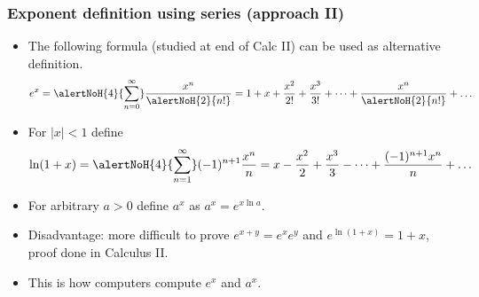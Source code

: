 \begin{frame}
\frametitle{Exponent definition using series (approach II)}
\begin{itemize}
\item<1-> The following formula (studied at end of Calc II) can be used as alternative definition.
\[
e^{x}=\alertNoH{4}{\sum_{n=0}^{\infty}} \frac{x^n}{\alertNoH{2}{n!}}= 1+ x+\frac{x^2}{2!}+\frac{x^3}{3!}+\dots + \frac{x^{n}}{\alertNoH{2}{n!}}+\dots
\]
\item<3-> For $|x|<1$ define 
\[
\ln (1+x)=\alertNoH{4}{\sum_{n=1}^{\infty}} (-1)^{n+1}\frac{x^n}{n}=  x-\frac{x^2}{2}+\frac{x^3}{3}-\dots + \frac{(-1)^{n+1}x^{n}}{n}+\dots
\]
\item<5-> For arbitrary $a>0$ define $a^x$ as $a^x=e^{x\ln a}$. 
\item<6-> Disadvantage: more difficult to prove $e^{x+y}= e^{x} e^y$ and $e^{\ln(1+x)}=1+x$, proof done in Calculus II.
\item<7-> This is how computers compute $e^x$ and $a^x$.
\end{itemize}
\end{frame}

